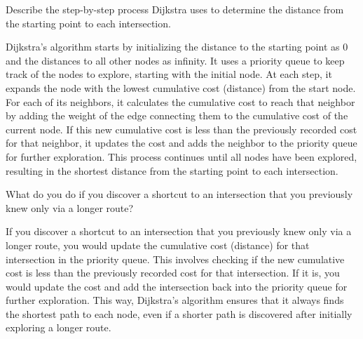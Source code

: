 \begin{ejercicio}[Procedure]
    Describe the step-by-step process Dijkstra uses to determine the distance from the starting point to each intersection.

    Dijkstra's algorithm starts by initializing the distance to the starting point as 0 and the distances to all other nodes as infinity. It uses a priority queue to keep track of the nodes to explore, starting with the initial node. At each step, it expands the node with the lowest cumulative cost (distance) from the start node. For each of its neighbors, it calculates the cumulative cost to reach that neighbor by adding the weight of the edge connecting them to the cumulative cost of the current node. If this new cumulative cost is less than the previously recorded cost for that neighbor, it updates the cost and adds the neighbor to the priority queue for further exploration. This process continues until all nodes have been explored, resulting in the shortest distance from the starting point to each intersection.
\end{ejercicio}
\begin{ejercicio}
    What do you do if you discover a shortcut to an intersection that you previously knew only via a longer route?

    If you discover a shortcut to an intersection that you previously knew only via a longer route, you would update the cumulative cost (distance) for that intersection in the priority queue. This involves checking if the new cumulative cost is less than the previously recorded cost for that intersection. If it is, you would update the cost and add the intersection back into the priority queue for further exploration. This way, Dijkstra's algorithm ensures that it always finds the shortest path to each node, even if a shorter path is discovered after initially exploring a longer route.
\end{ejercicio}

